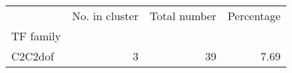 \begin{tabular}{lrrr}
\toprule
{} &  No. in cluster &  Total number &  Percentage \\
TF family &                 &               &             \\
\midrule
C2C2dof   &               3 &            39 &        7.69 \\
\bottomrule
\end{tabular}
